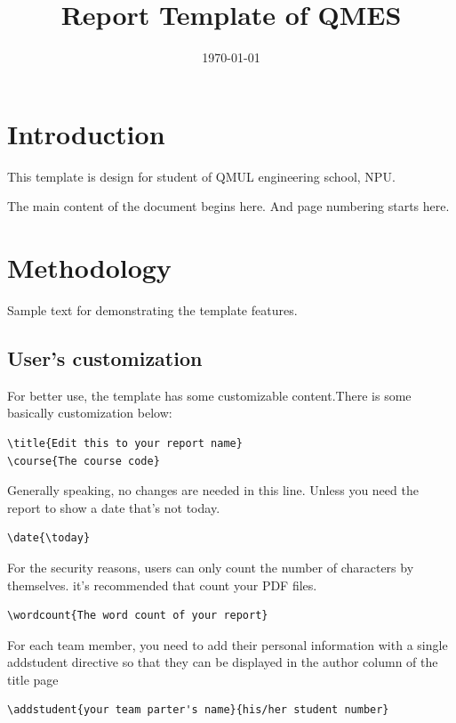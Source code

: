 \documentclass{qmes-template}
\title{Report Template of QMES}
\date{\today}
\begin{document}
\maketitle
\tableofcontents

\section{Introduction}
This template is design for student of QMUL engineering school, NPU.

The main content of the document begins here. And page numbering starts here.

\section{Methodology}
Sample text for demonstrating the template features.

\subsection{User's customization}
For better use, the template has some customizable content.There is some
basically customization below:
\begin{lstlisting}
\title{Edit this to your report name}
\course{The course code}
\end{lstlisting}

Generally speaking, no changes are needed in this line. Unless you need the
report to show a date that's not today.
\begin{lstlisting}
\date{\today}
\end{lstlisting}

For the security reasons, users can only count the number of characters by
themselves. it's recommended that count your PDF files.
\begin{lstlisting}
\wordcount{The word count of your report}
\end{lstlisting}

For each team member, you need to add their personal information with a single
addstudent directive so that they can be displayed in the author column of the
title page
\begin{lstlisting}
\addstudent{your team parter's name}{his/her student number}
\end{lstlisting}

\newpage{}
\end{document}
